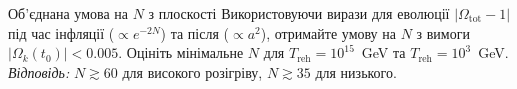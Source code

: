 
\begin{problem}{Об'єднана умова на $N$ з плоскості}
	Використовуючи вирази для еволюції $|\Omega_{\text{tot}}-1|$ під час
	інфляції ($\propto e^{-2N}$) та після ($\propto a^2$),
	отримайте умову на $N$ з вимоги $|\Omega_k(t_0)| < 0.005$.
	Оцініть мінімальне $N$ для $T_{\text{reh}} = 10^{15}$~GeV та $T_{\text{reh}} = 10^3$~GeV.
	\textit{Відповідь:} $N \gtrsim 60$ для високого розігріву,
	$N \gtrsim 35$ для низького.
\end{problem}